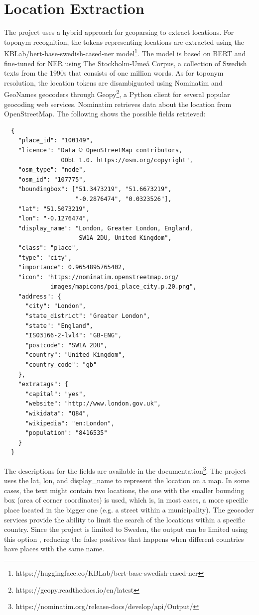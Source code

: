 \section{Location Extraction}

The project uses a hybrid approach for geoparsing to extract locations. For toponym recognition, the
tokens representing locations are extracted using the KBLab/bert-base-swedish-cased-ner
model\footnote{https://huggingface.co/KBLab/bert-base-swedish-cased-ner}. The model is based on BERT
and fine-tuned for \ac{NER} using The Stockholm-Umeå Corpus, a collection of Swedish texts from the
1990s that consists of one million words. As for toponym resolution, the location tokens are
disambiguated using Nominatim and GeoNames geocoders through
Geopy\footnote{https://geopy.readthedocs.io/en/latest}, a Python client for several
popular geocoding web services. Nominatim retrieves data about the location from OpenStreetMap. The
following shows the possible fields retrieved:

  \begin{verbatim}
  {
    "place_id": "100149",
    "licence": "Data © OpenStreetMap contributors, 
                ODbL 1.0. https://osm.org/copyright",
    "osm_type": "node",
    "osm_id": "107775",
    "boundingbox": ["51.3473219", "51.6673219", 
                    "-0.2876474", "0.0323526"],
    "lat": "51.5073219",
    "lon": "-0.1276474",
    "display_name": "London, Greater London, England, 
                     SW1A 2DU, United Kingdom",
    "class": "place",
    "type": "city",
    "importance": 0.9654895765402,
    "icon": "https://nominatim.openstreetmap.org/
             images/mapicons/poi_place_city.p.20.png",
    "address": {
      "city": "London",
      "state_district": "Greater London",
      "state": "England",
      "ISO3166-2-lvl4": "GB-ENG",
      "postcode": "SW1A 2DU",
      "country": "United Kingdom",
      "country_code": "gb"
    },
    "extratags": {
      "capital": "yes",
      "website": "http://www.london.gov.uk",
      "wikidata": "Q84",
      "wikipedia": "en:London",
      "population": "8416535"
    }
  }                           
  \end{verbatim}

The descriptions for the fields are available in the
documentation\footnote{https://nominatim.org/release-docs/develop/api/Output/}. The project uses
the lat, lon, and display\_name to represent the location on a map. In some cases, the text might
contain two locations, the one with the smaller bounding box (area of corner coordinates) is used,
which is, in most cases, a more specific place located in the bigger one (e.g. a street within a
municipality). The geocoder services provide the ability to limit the search of the locations
within a specific country. Since the project is limited to Sweden, the output can be limited using
this option , reducing the false positives that happens when different countries have places with
the same name.

